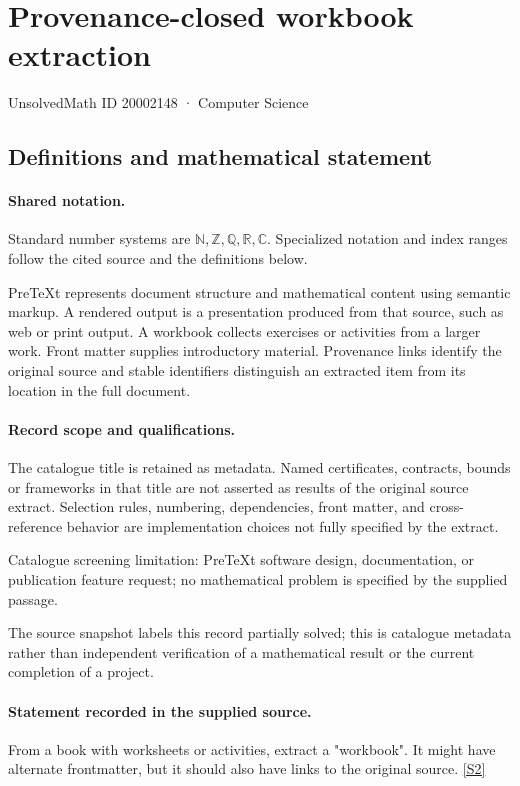 \documentclass[11pt]{article}
\newcommand{\sref}[2]{\hyperlink{source:#1:#2}{[S#2]}}
\begin{document}
\setcounter{section}{20002147}
\section{Provenance-closed workbook extraction}\label{20002148}
{\small\sffamily UnsolvedMath ID 20002148 · Computer Science}
\subsection{Definitions and mathematical statement}

\paragraph{Shared notation.}Standard number systems are $\mathbb N,\mathbb Z,\mathbb Q,\mathbb R,\mathbb C$. Specialized notation and index ranges follow the cited source and the definitions below.


PreTeXt represents document structure and mathematical content using semantic markup. A rendered output is a presentation produced from that source, such as web or print output. A workbook collects exercises or activities from a larger work. Front matter supplies introductory material. Provenance links identify the original source and stable identifiers distinguish an extracted item from its location in the full document.
\paragraph{Record scope and qualifications.}
The catalogue title is retained as metadata. Named certificates, contracts, bounds or frameworks in that title are not asserted as results of the original source extract.
Selection rules, numbering, dependencies, front matter, and cross-reference behavior are implementation choices not fully specified by the extract.

Catalogue screening limitation: PreTeXt software design, documentation, or publication feature request; no mathematical problem is specified by the supplied passage.

The source snapshot labels this record partially solved; this is catalogue metadata rather than independent verification of a mathematical result or the current completion of a project.
\paragraph{Statement recorded in the supplied source.}
From a book with worksheets or activities, extract a "workbook". It might have alternate frontmatter, but it should also have links to the original source. \sref{20002148}{2}
\end{document}
